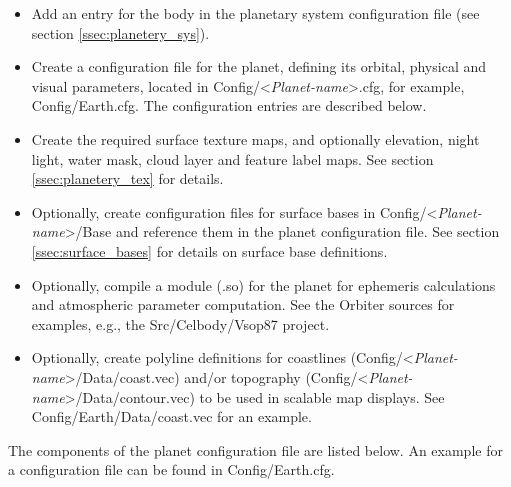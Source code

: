 \documentclass[Orbiter Developer Manual.tex]{subfiles}
\begin{document}
\begin{itemize}
\item Add an entry for the body in the planetary system configuration file (see section \ref{ssec:planetery_sys}).
\item Create a configuration file for the planet, defining its orbital, physical and visual parameters, located in Config/<\textit{Planet-name}>.cfg, for example, Config/Earth.cfg. The configuration entries are described below.
\item Create the required surface texture maps, and optionally elevation, night light, water mask, cloud layer and feature label maps. See section \ref{ssec:planetery_tex} for details.
\item Optionally, create configuration files for surface bases in Config/<\textit{Planet-name}>/Base and reference them in the planet configuration file. See section \ref{ssec:surface_bases} for details on surface base definitions.
\item Optionally, compile a module (.so) for the planet for ephemeris calculations and atmospheric parameter computation. See the Orbiter sources for examples, e.g., the Src/Celbody/Vsop87 project.
\item Optionally, create polyline definitions for coastlines (Config/<\textit{Planet-name}>/Data/coast.vec) and/or topography (Config/<\textit{Planet-name}>/Data/contour.vec) to be used in scalable map displays. See Config/Earth/Data/coast.vec for an example.
\end{itemize}

\noindent
The components of the planet configuration file are listed below. An example for a configuration file can be found in Config/Earth.cfg.
\end{document}
